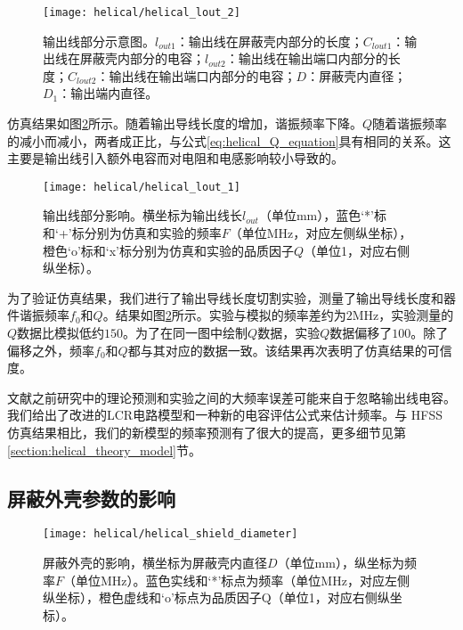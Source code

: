 \begin{figure}
    \centering
    \caption[输出线部分示意图]{输出线部分示意图。$l_{out1}$：输出线在屏蔽壳内部分的长度；$C_{lout1}$：输出线在屏蔽壳内部分的电容；$l_{out2}$：输出线在输出端口内部分的长度；$C_{lout2}$：输出线在输出端口内部分的电容；$D$：屏蔽壳内直径；$D_1$：输出端内直径。\label{fig:helical_lout_2}}
    \texttt{[image: helical/helical\_lout\_2]}
\end{figure}

仿真结果如图\ref{fig:helical_lout_1}所示。随着输出导线长度的增加，谐振频率下降。$Q$随着谐振频率的减小而减小，两者成正比，与公式\eqref{eq:helical_Q_equation}具有相同的关系。这主要是输出线引入额外电容而对电阻和电感影响较小导致的。

\begin{figure}
    \centering
    \caption[输出线部分影响]{输出线部分影响。横坐标为输出线长$l_{out}$（单位mm），蓝色‘*’标和‘+’标分别为仿真和实验的频率$F$（单位MHz，对应左侧纵坐标），橙色‘o’标和‘x’标分别为仿真和实验的品质因子$Q$（单位1，对应右侧纵坐标）。\label{fig:helical_lout_1}}
    \texttt{[image: helical/helical\_lout\_1]}
\end{figure}

为了验证仿真结果，我们进行了输出导线长度切割实验，测量了输出导线长度和器件谐振频率$f_0$和$Q$。结果如图\ref{fig:helical_lout_1}所示。实验与模拟的频率差约为$2$MHz，实验测量的$Q$数据比模拟低约$150$。为了在同一图中绘制$ Q $数据，实验$ Q $数据偏移了$ 100$。除了偏移之外，频率$f_0$和$ Q $都与其对应的数据一致。该结果再次表明了仿真结果的可信度。

文献\cite[]{Gandolfi_Niedermayr_Kumph_Brownnutt_Blatt_2012,Macalpine_Schildknecht_1959, Deng_Sun_Yuan_Xu_Zhang_Lu_Luo_2014}之前研究中的理论预测和实验之间的大频率误差可能来自于忽略输出线电容\cite[]{Nandi_Sikdar_Das_Ray_2022, Batra_Panja_De_Roy_Majhi_Yadav_Sen_Gupta_2017}。我们给出了改进的LCR电路模型和一种新的电容评估公式来估计频率。与 HFSS 仿真结果相比，我们的新模型的频率预测有了很大的提高，更多细节见第\ref{section:helical_theory_model}节。

\subsection[屏蔽外壳参数的影响]{屏蔽外壳参数的影响}
\begin{figure}
    \centering
    \caption[屏蔽外壳的影响]{屏蔽外壳的影响，横坐标为屏蔽壳内直径$D$（单位mm），纵坐标为频率$F$（单位MHz）。蓝色实线和‘*’标点为频率（单位MHz，对应左侧纵坐标），橙色虚线和‘o’标点为品质因子Q（单位1，对应右侧纵坐标）。\label{fig:helical_shield_diameter}}
    \texttt{[image: helical/helical\_shield\_diameter]}
\end{figure}

